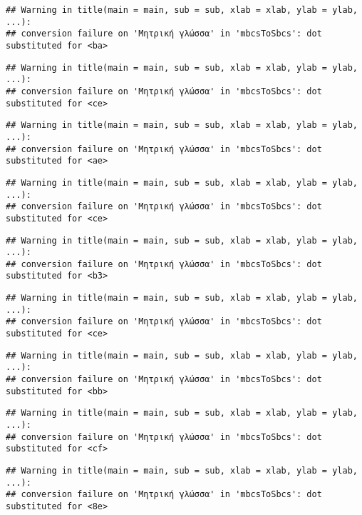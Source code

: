 \documentclass[
]{article}
\begin{document}
\begin{verbatim}
## Warning in title(main = main, sub = sub, xlab = xlab, ylab = ylab, ...):
## conversion failure on 'Μητρική γλώσσα' in 'mbcsToSbcs': dot substituted for <ba>
\end{verbatim}

\begin{verbatim}
## Warning in title(main = main, sub = sub, xlab = xlab, ylab = ylab, ...):
## conversion failure on 'Μητρική γλώσσα' in 'mbcsToSbcs': dot substituted for <ce>
\end{verbatim}

\begin{verbatim}
## Warning in title(main = main, sub = sub, xlab = xlab, ylab = ylab, ...):
## conversion failure on 'Μητρική γλώσσα' in 'mbcsToSbcs': dot substituted for <ae>
\end{verbatim}

\begin{verbatim}
## Warning in title(main = main, sub = sub, xlab = xlab, ylab = ylab, ...):
## conversion failure on 'Μητρική γλώσσα' in 'mbcsToSbcs': dot substituted for <ce>
\end{verbatim}

\begin{verbatim}
## Warning in title(main = main, sub = sub, xlab = xlab, ylab = ylab, ...):
## conversion failure on 'Μητρική γλώσσα' in 'mbcsToSbcs': dot substituted for <b3>
\end{verbatim}

\begin{verbatim}
## Warning in title(main = main, sub = sub, xlab = xlab, ylab = ylab, ...):
## conversion failure on 'Μητρική γλώσσα' in 'mbcsToSbcs': dot substituted for <ce>
\end{verbatim}

\begin{verbatim}
## Warning in title(main = main, sub = sub, xlab = xlab, ylab = ylab, ...):
## conversion failure on 'Μητρική γλώσσα' in 'mbcsToSbcs': dot substituted for <bb>
\end{verbatim}

\begin{verbatim}
## Warning in title(main = main, sub = sub, xlab = xlab, ylab = ylab, ...):
## conversion failure on 'Μητρική γλώσσα' in 'mbcsToSbcs': dot substituted for <cf>
\end{verbatim}

\begin{verbatim}
## Warning in title(main = main, sub = sub, xlab = xlab, ylab = ylab, ...):
## conversion failure on 'Μητρική γλώσσα' in 'mbcsToSbcs': dot substituted for <8e>
\end{verbatim}
\end{document}
